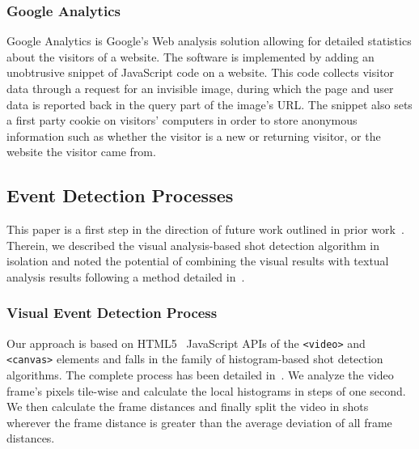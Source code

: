 \documentclass[runningheads,a4paper]{llncs}
\begin{document}
\subsubsection{Google Analytics}
Google Analytics is Google's Web analysis solution allowing for detailed statistics about the visitors of a website. The software is implemented by adding an unobtrusive snippet of JavaScript code on a website. This code collects visitor data through a request for an invisible image, during which the page and user data is reported back in the query part of the image's URL. The snippet also sets a first party cookie on visitors' computers in order to store anonymous information such as whether the visitor is a new or returning visitor, or the website the visitor came from.

\subsection{Event Detection Processes}
This paper is a first step in the direction of future work outlined in prior work~\cite{artemis}. Therein, we described the visual analysis-based shot detection algorithm in isolation and noted the potential of combining the visual results with textual analysis results following a method detailed in~\cite{semwebvid}.

\subsubsection{Visual Event Detection Process}
Our approach is based on HTML5~\cite{w3c_html5} JavaScript APIs of the \texttt{<video>} and \texttt{<canvas>} elements and falls in the family of histogram-based shot detection algorithms. The complete process has been detailed in~\cite{artemis}. We analyze the video frame's pixels tile-wise and calculate the local histograms in steps of one second. We then calculate the frame distances and finally split the video in shots wherever the frame distance is greater than the average deviation of all frame distances.
\end{document}
